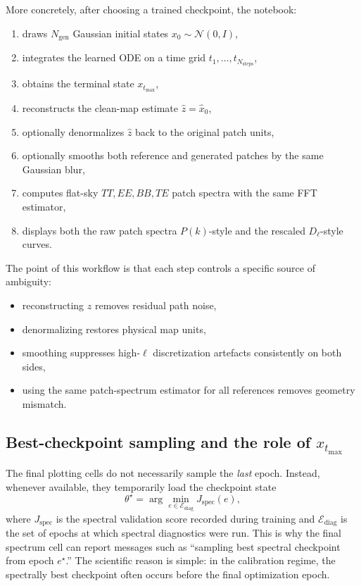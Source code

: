 \documentclass[11pt]{article}
\begin{document}
More concretely, after choosing a trained checkpoint, the notebook:
\begin{enumerate}[leftmargin=1.5em]
  \item draws \(N_{\mathrm{gen}}\) Gaussian initial states \(x_0\sim \mathcal N(0,I)\),
  \item integrates the learned ODE on a time grid \(t_1,\dots,t_{N_{\mathrm{steps}}}\),
  \item obtains the terminal state \(x_{t_{\max}}\),
  \item reconstructs the clean-map estimate \(\hat z = \hat x_0\),
  \item optionally denormalizes \(\hat z\) back to the original patch units,
  \item optionally smooths both reference and generated patches by the same Gaussian blur,
  \item computes flat-sky \(TT,EE,BB,TE\) patch spectra with the same FFT estimator,
  \item displays both the raw patch spectra \(P(k)\)-style and the rescaled \(D_\ell\)-style curves.
\end{enumerate}

The point of this workflow is that each step controls a specific source of ambiguity:
\begin{itemize}[leftmargin=1.5em]
  \item reconstructing \(\hat z\) removes residual path noise,
  \item denormalizing restores physical map units,
  \item smoothing suppresses high-\(\ell\) discretization artefacts consistently on both sides,
  \item using the same patch-spectrum estimator for all references removes geometry mismatch.
\end{itemize}

\subsection{Best-checkpoint sampling and the role of \(x_{t_{\max}}\)}

The final plotting cells do not necessarily sample the \emph{last} epoch. Instead, whenever available, they temporarily load the checkpoint state
\begin{equation}
  \theta^\star
  =
  \arg\min_{e\in\mathcal E_{\mathrm{diag}}} J_{\mathrm{spec}}(e),
\end{equation}
where \(J_{\mathrm{spec}}\) is the spectral validation score recorded during training and \(\mathcal E_{\mathrm{diag}}\) is the set of epochs at which spectral diagnostics were run. This is why the final spectrum cell can report messages such as ``sampling best spectral checkpoint from epoch \(e^\star\).'' The scientific reason is simple: in the calibration regime, the spectrally best checkpoint often occurs before the final optimization epoch.
\end{document}
